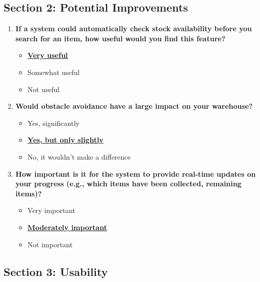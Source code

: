 \subsection*{Section 2: Potential Improvements}

\begin{enumerate}
    \item \textbf{If a system could automatically check stock availability before you search for an item, how useful would you find this feature?}
    \begin{itemize}
        \item \textbf{\underline{Very useful}}
        \item Somewhat useful
        \item Not useful
    \end{itemize}

    \item \textbf{Would obstacle avoidance have a large impact on your warehouse?}
    \begin{itemize}
        \item Yes, significantly
        \item \textbf{\underline{Yes, but only slightly}}
        \item No, it wouldn’t make a difference
    \end{itemize}

    \item \textbf{How important is it for the system to provide real-time updates on your progress (e.g., which items have been collected, remaining items)?}
    \begin{itemize}
        \item Very important
        \item \textbf{\underline{Moderately important}}
        \item Not important
    \end{itemize}

\end{enumerate}

\newpage

\subsection*{Section 3: Usability}

